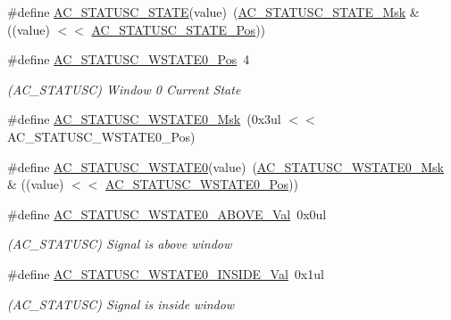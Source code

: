 \begin{DoxyCompactItemize}
\item 
\#define \mbox{\hyperlink{group___s_a_m_d21___a_c_ga5ffdf587daccc88c7eb1e87001b3a62c}{A\+C\+\_\+\+S\+T\+A\+T\+U\+S\+C\+\_\+\+S\+T\+A\+TE}}(value)~(\mbox{\hyperlink{group___s_a_m_d21___a_c_ga66421cfd7ec027deb7733d6761af6996}{A\+C\+\_\+\+S\+T\+A\+T\+U\+S\+C\+\_\+\+S\+T\+A\+T\+E\+\_\+\+Msk}} \& ((value) $<$$<$ \mbox{\hyperlink{group___s_a_m_d21___a_c_ga1b6fe3fde56518bb8c0c832c56a4fe7c}{A\+C\+\_\+\+S\+T\+A\+T\+U\+S\+C\+\_\+\+S\+T\+A\+T\+E\+\_\+\+Pos}}))
\item 
\#define \mbox{\hyperlink{group___s_a_m_d21___a_c_ga1b97310cd9387a8aaf98120807fbc084}{A\+C\+\_\+\+S\+T\+A\+T\+U\+S\+C\+\_\+\+W\+S\+T\+A\+T\+E0\+\_\+\+Pos}}~4
\begin{DoxyCompactList}\small\item\em (A\+C\+\_\+\+S\+T\+A\+T\+U\+SC) Window 0 Current State \end{DoxyCompactList}\item 
\#define \mbox{\hyperlink{group___s_a_m_d21___a_c_gad9c7a28b2dff146671a8e9f540060691}{A\+C\+\_\+\+S\+T\+A\+T\+U\+S\+C\+\_\+\+W\+S\+T\+A\+T\+E0\+\_\+\+Msk}}~(0x3ul $<$$<$ A\+C\+\_\+\+S\+T\+A\+T\+U\+S\+C\+\_\+\+W\+S\+T\+A\+T\+E0\+\_\+\+Pos)
\item 
\#define \mbox{\hyperlink{group___s_a_m_d21___a_c_gad051d74be1293cc5632b08fbc032d2c5}{A\+C\+\_\+\+S\+T\+A\+T\+U\+S\+C\+\_\+\+W\+S\+T\+A\+T\+E0}}(value)~(\mbox{\hyperlink{group___s_a_m_d21___a_c_gad9c7a28b2dff146671a8e9f540060691}{A\+C\+\_\+\+S\+T\+A\+T\+U\+S\+C\+\_\+\+W\+S\+T\+A\+T\+E0\+\_\+\+Msk}} \& ((value) $<$$<$ \mbox{\hyperlink{group___s_a_m_d21___a_c_ga1b97310cd9387a8aaf98120807fbc084}{A\+C\+\_\+\+S\+T\+A\+T\+U\+S\+C\+\_\+\+W\+S\+T\+A\+T\+E0\+\_\+\+Pos}}))
\item 
\#define \mbox{\hyperlink{group___s_a_m_d21___a_c_gad53340ca7e9842ae457a29447dd490ab}{A\+C\+\_\+\+S\+T\+A\+T\+U\+S\+C\+\_\+\+W\+S\+T\+A\+T\+E0\+\_\+\+A\+B\+O\+V\+E\+\_\+\+Val}}~0x0ul
\begin{DoxyCompactList}\small\item\em (A\+C\+\_\+\+S\+T\+A\+T\+U\+SC) Signal is above window \end{DoxyCompactList}\item 
\#define \mbox{\hyperlink{group___s_a_m_d21___a_c_ga40516ba367c5a39e3c3713f0fa607d9e}{A\+C\+\_\+\+S\+T\+A\+T\+U\+S\+C\+\_\+\+W\+S\+T\+A\+T\+E0\+\_\+\+I\+N\+S\+I\+D\+E\+\_\+\+Val}}~0x1ul
\begin{DoxyCompactList}\small\item\em (A\+C\+\_\+\+S\+T\+A\+T\+U\+SC) Signal is inside window \end{DoxyCompactList}\item 
$$
\end{DoxyCompactItemize}

